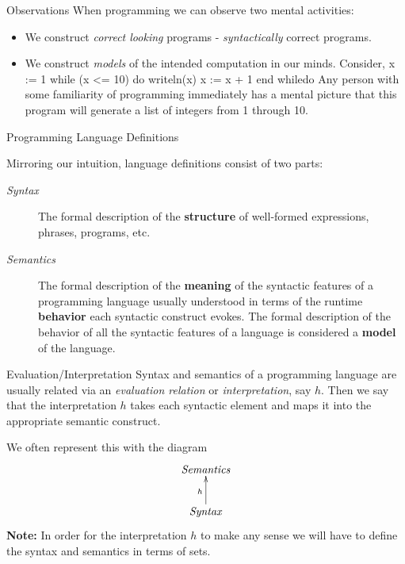 \documentclass{beamer}
\begin{document}
\begin{frame}[fragile]{Observations}
When programming we can observe two mental activities:
\begin{itemize}
\item We construct {\em correct looking} programs - {\em syntactically} correct programs.
\item We construct {\em models} of the intended computation in our minds. Consider,
\bcode
x := 1
while (x <= 10) do
     writeln(x)
     x := x + 1
end whiledo
\ecode
Any person with some familiarity of programming immediately has a mental picture that this program
will generate a list of integers from 1 through 10.
\end{itemize}

\end{frame}

\begin{frame}{Programming Language Definitions}

Mirroring our intuition, language definitions consist of two parts:

\begin{description}
\item[\em Syntax] The formal description of the
{\bf structure} of  well-formed expressions, phrases, programs, etc.
\item[\em Semantics] The formal description of the {\bf  meaning} of the syntactic features of a programming language
usually understood in terms of the runtime {\bf behavior} each syntactic construct evokes.  The formal description of the behavior of all
the syntactic features of a language is considered a {\bf model} of the language.
\end{description}
\end{frame}

\begin{frame}{Evaluation/Interpretation}
Syntax and semantics of a programming language are usually related via an {\em evaluation relation}
or {\em interpretation}, say $h$.  Then we say that the interpretation $h$ takes each syntactic element and
maps it into the appropriate semantic construct.

\vspace{.1in}

We often represent this with the diagram
\[
\xymatrix{
\mathit{Semantics}\\
\mathit{Syntax}\ar[u]^h
}
\]
{\bf Note:} In order for the interpretation $h$ to make any sense we will have to define the syntax and
semantics in terms of sets.

\end{frame}
\end{document}
